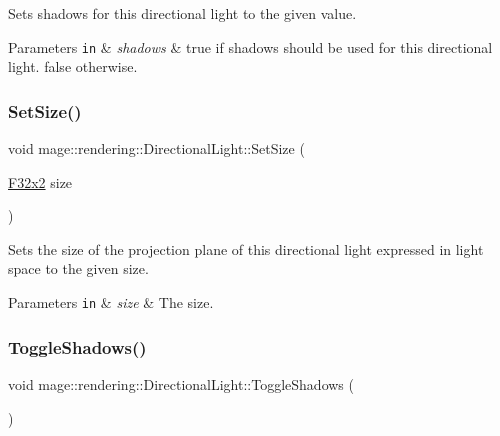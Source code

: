 Sets shadows for this directional light to the given value.


\begin{DoxyParams}[1]{Parameters}
\mbox{\tt in}  & {\em shadows} & {\ttfamily true} if shadows should be used for this directional light. {\ttfamily false} otherwise. \\
\hline
\end{DoxyParams}
\mbox{\label{classmage_1_1rendering_1_1_directional_light_aae69d3285b7980ad7215e1b517d0a8fd}} 
\subsubsection{\texorpdfstring{Set\+Size()}{SetSize()}}
{\footnotesize\ttfamily void mage\+::rendering\+::\+Directional\+Light\+::\+Set\+Size (\begin{DoxyParamCaption}\item[{\mbox{\hyperlink{namespacemage_aee4759dedc8def6c6dec26b5c7eddf29}{F32x2}}}]{size }\end{DoxyParamCaption})\hspace{0.3cm}{\ttfamily [noexcept]}}

Sets the size of the projection plane of this directional light expressed in light space to the given size.


\begin{DoxyParams}[1]{Parameters}
\mbox{\tt in}  & {\em size} & The size. \\
\hline
\end{DoxyParams}
\mbox{\label{classmage_1_1rendering_1_1_directional_light_a34a939e192e857ac25f6d91dd773ec9b}} 
\subsubsection{\texorpdfstring{Toggle\+Shadows()}{ToggleShadows()}}
{\footnotesize\ttfamily void mage\+::rendering\+::\+Directional\+Light\+::\+Toggle\+Shadows (\begin{DoxyParamCaption}{ }\end{DoxyParamCaption})\hspace{0.3cm}{\ttfamily [noexcept]}}

